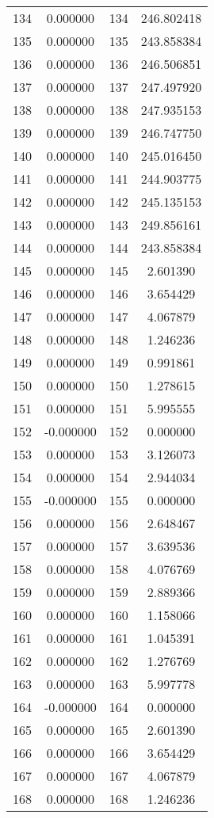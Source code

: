 \documentclass[12pt]{article}
\begin{document}
\begin{longtable}{@{}cccc@{}}
134 & 0.000000 & 134 & 246.802418 \\
135 & 0.000000 & 135 & 243.858384 \\
136 & 0.000000 & 136 & 246.506851 \\
137 & 0.000000 & 137 & 247.497920 \\
138 & 0.000000 & 138 & 247.935153 \\
139 & 0.000000 & 139 & 246.747750 \\
140 & 0.000000 & 140 & 245.016450 \\
141 & 0.000000 & 141 & 244.903775 \\
142 & 0.000000 & 142 & 245.135153 \\
143 & 0.000000 & 143 & 249.856161 \\
144 & 0.000000 & 144 & 243.858384 \\
145 & 0.000000 & 145 & 2.601390 \\
146 & 0.000000 & 146 & 3.654429 \\
147 & 0.000000 & 147 & 4.067879 \\
148 & 0.000000 & 148 & 1.246236 \\
149 & 0.000000 & 149 & 0.991861 \\
150 & 0.000000 & 150 & 1.278615 \\
151 & 0.000000 & 151 & 5.995555 \\
152 & -0.000000 & 152 & 0.000000 \\
153 & 0.000000 & 153 & 3.126073 \\
154 & 0.000000 & 154 & 2.944034 \\
155 & -0.000000 & 155 & 0.000000 \\
156 & 0.000000 & 156 & 2.648467 \\
157 & 0.000000 & 157 & 3.639536 \\
158 & 0.000000 & 158 & 4.076769 \\
159 & 0.000000 & 159 & 2.889366 \\
160 & 0.000000 & 160 & 1.158066 \\
161 & 0.000000 & 161 & 1.045391 \\
162 & 0.000000 & 162 & 1.276769 \\
163 & 0.000000 & 163 & 5.997778 \\
164 & -0.000000 & 164 & 0.000000 \\
165 & 0.000000 & 165 & 2.601390 \\
166 & 0.000000 & 166 & 3.654429 \\
167 & 0.000000 & 167 & 4.067879 \\
168 & 0.000000 & 168 & 1.246236 \\

\end{longtable}
\end{document}
